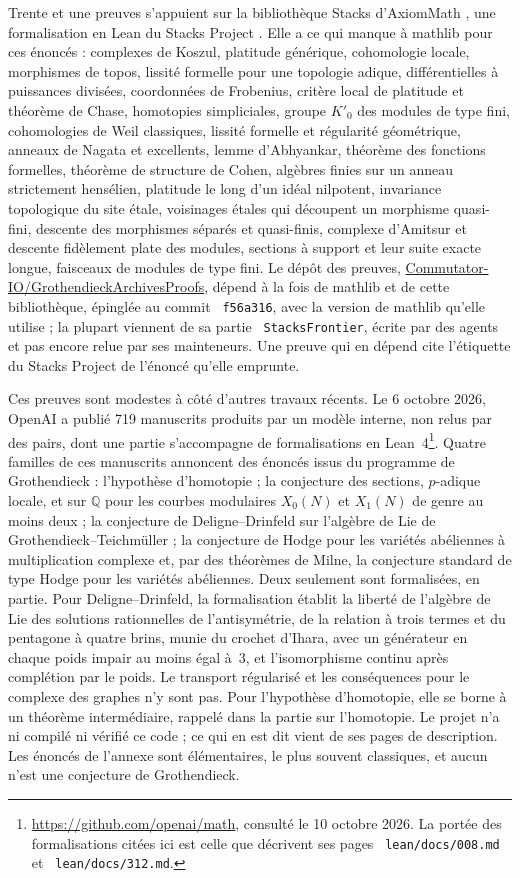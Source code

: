 \documentclass[11pt]{article}
\theoremstyle{plain}
\theoremstyle{definition}
\theoremstyle{plain}
\theoremstyle{definition}
\theoremstyle{remark}
\renewcommand{\_}{\bkunderscore\allowbreak}
\let\origtexttt\texttt
\renewcommand{\texttt}[1]{\origtexttt{\XeTeXinterchartokenstate=1 #1}}
\begin{document}
Trente et une preuves s'appuient sur la bibliothèque Stacks d'AxiomMath \cite{axiomstacks}, une formalisation en Lean du Stacks Project \cite{stacks}. Elle a ce qui manque à mathlib pour ces énoncés : complexes de Koszul, platitude générique, cohomologie locale, morphismes de topos, lissité formelle pour une topologie adique, différentielles à puissances divisées, coordonnées de Frobenius, critère local de platitude et théorème de Chase, homotopies simpliciales, groupe $K'_0$ des modules de type fini, cohomologies de Weil classiques, lissité formelle et régularité géométrique, anneaux de Nagata et excellents, lemme d'Abhyankar, théorème des fonctions formelles, théorème de structure de Cohen, algèbres finies sur un anneau strictement hensélien, platitude le long d'un idéal nilpotent, invariance topologique du site étale, voisinages étales qui découpent un morphisme quasi-fini, descente des morphismes séparés et quasi-finis, complexe d'Amitsur et descente fidèlement plate des modules, sections à support et leur suite exacte longue, faisceaux de modules de type fini. Le dépôt des preuves, \href{https://github.com/Commutator-IO/GrothendieckArchivesProofs}{Commutator-IO/GrothendieckArchivesProofs}, dépend à la fois de mathlib et de cette bibliothèque, épinglée au commit \texttt{f56a316}, avec la version de mathlib qu'elle utilise ; la plupart viennent de sa partie \texttt{StacksFrontier}, écrite par des agents et pas encore relue par ses mainteneurs. Une preuve qui en dépend cite l'étiquette du Stacks Project de l'énoncé qu'elle emprunte.

Ces preuves sont modestes à côté d'autres travaux récents. Le 6 octobre 2026, OpenAI a publié 719 manuscrits produits par un modèle interne, non relus par des pairs, dont une partie s'accompagne de formalisations en Lean~4\footnote{\url{https://github.com/openai/math}, consulté le 10 octobre 2026. La portée des formalisations citées ici est celle que décrivent ses pages \texttt{lean/docs/008.md} et \texttt{lean/docs/312.md}.}. Quatre familles de ces manuscrits annoncent des énoncés issus du programme de Grothendieck : l'hypothèse d'homotopie ; la conjecture des sections, $p$-adique locale, et sur $\mathbb{Q}$ pour les courbes modulaires $X_0(N)$ et $X_1(N)$ de genre au moins deux ; la conjecture de Deligne--Drinfeld sur l'algèbre de Lie de Grothendieck--Teichmüller ; la conjecture de Hodge pour les variétés abéliennes à multiplication complexe et, par des théorèmes de Milne, la conjecture standard de type Hodge pour les variétés abéliennes. Deux seulement sont formalisées, en partie. Pour Deligne--Drinfeld, la formalisation établit la liberté de l'algèbre de Lie des solutions rationnelles de l'antisymétrie, de la relation à trois termes et du pentagone à quatre brins, munie du crochet d'Ihara, avec un générateur en chaque poids impair au moins égal à~3, et l'isomorphisme continu après complétion par le poids. Le transport régularisé et les conséquences pour le complexe des graphes n'y sont pas. Pour l'hypothèse d'homotopie, elle se borne à un théorème intermédiaire, rappelé dans la partie sur l'homotopie. Le projet n'a ni compilé ni vérifié ce code ; ce qui en est dit vient de ses pages de description. Les énoncés de l'annexe sont élémentaires, le plus souvent classiques, et aucun n'est une conjecture de Grothendieck.
\end{document}
